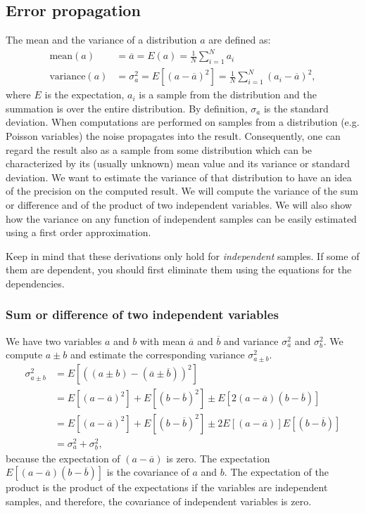 \documentclass[11pt,oneside]{article}
\begin{document}
\newpage
\subsection{Error propagation} \label{app:error}
The mean and the variance of a distribution $a$ are defined as:
\begin{align}
  \mbox{mean}(a) &= \overline{a} = E(a) = \frac{1}{N} \sum_{i=1}^N a_i\\
  \mbox{variance}(a) &= \sigma_a^2 = E\left[ (a - \overline{a})^2 \right]
   = \frac{1}{N} \sum_{i=1}^N (a_i - \overline{a})^2,
\end{align}
where $E$ is the expectation, $a_i$ is a sample from the distribution and the
summation is over the entire distribution. By definition, $\sigma_a$ is the
standard deviation. When computations are performed on samples from a
distribution (e.g. Poisson variables) the noise propagates into the
result. Consequently, one can regard the result also as a sample from some
distribution which can be characterized by its (usually unknown) mean value
and its variance or standard deviation. We want to estimate the variance of
that distribution to have an idea of the precision on the computed result. We
will compute the variance of the sum or difference and of the product of two
independent variables. We will also show how the variance on any function of
independent samples can be easily estimated using a first order approximation.

Keep in mind that these derivations only hold for {\em independent}
samples. If some of them are dependent, you should first eliminate them using
the equations for the dependencies.

\subsubsection{Sum or difference of two independent variables}
We have two variables $a$ and $b$ with mean $\overline{a}$ and $\overline{b}$
and variance $\sigma_a^2$ and $\sigma_b^2$. We compute $a \pm b$ and estimate
the corresponding variance $\sigma_{a \pm b}^2$.
\begin{align}
\sigma_{a \pm b}^2 &= E\left[\left((a \pm b) - (\overline{a} \pm \overline{b}) \right)^2\right]
           \nonumber\\
 &= E\left[(a-\overline{a})^2\right] + E\left[(b-\overline{b})^2\right] \pm E\left[2(a-\overline{a})(b-\overline{b})\right]
           \nonumber\\
 &= E\left[(a-\overline{a})^2\right] + E\left[(b-\overline{b})^2\right] \pm 2 E\left[(a-\overline{a})\right]E\left[(b-\overline{b})\right]
           \nonumber\\
 &= \sigma_a^2 + \sigma_b^2, \label{eq:app_sumerror}
\end{align}
because the expectation of $(a - \overline{a})$ is zero. The expectation
$E\left[(a-\overline{a})(b-\overline{b})\right]$ is the covariance of $a$ and $b$. The
expectation of the product is the product of the expectations if the
variables are independent samples, and therefore, the covariance of
independent variables is zero.
\end{document}

